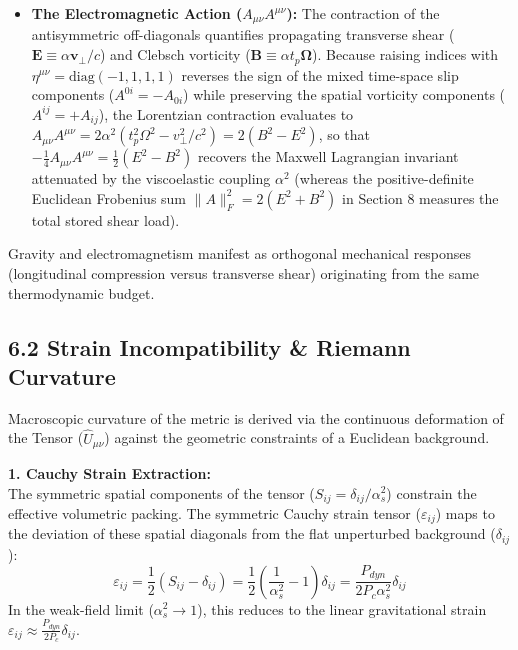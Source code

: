\begin{itemize}
    \item \textbf{The Electromagnetic Action ($A_{\mu\nu} A^{\mu\nu}$):} The contraction of the antisymmetric off-diagonals quantifies propagating transverse shear ($\mathbf{E} \equiv \alpha\mathbf{v}_\perp/c$) and Clebsch vorticity ($\mathbf{B} \equiv \alpha t_p\boldsymbol{\Omega}$). Because raising indices with $\eta^{\mu\nu} = \text{diag}(-1,1,1,1)$ reverses the sign of the mixed time-space slip components ($A^{0i} = -A_{0i}$) while preserving the spatial vorticity components ($A^{ij} = +A_{ij}$), the Lorentzian contraction evaluates to $A_{\mu\nu} A^{\mu\nu} = 2\alpha^2(t_p^2\Omega^2 - v_\perp^2/c^2) = 2(B^2 - E^2)$, so that $-\frac{1}{4}A_{\mu\nu}A^{\mu\nu} = \frac{1}{2}(E^2 - B^2)$ recovers the Maxwell Lagrangian invariant attenuated by the viscoelastic coupling $\alpha^2$ (whereas the positive-definite Euclidean Frobenius sum $\|A\|_F^2 = 2(E^2 + B^2)$ in Section 8 measures the total stored shear load).
\end{itemize}
Gravity and electromagnetism manifest as orthogonal mechanical responses (longitudinal compression versus transverse shear) originating from the same thermodynamic budget.

\subsection*{6.2 Strain Incompatibility \& Riemann Curvature}
\label{sec:deriv_incompatibility}

Macroscopic curvature of the metric is derived via the continuous deformation of the Tensor ($\hat{U}_{\mu\nu}$) against the geometric constraints of a Euclidean background.

\vspace{0.2 cm}

\textbf{1. Cauchy Strain Extraction:} \\
The symmetric spatial components of the tensor ($S_{ij} = \delta_{ij}/\alpha_s^2$) constrain the effective volumetric packing. The symmetric Cauchy strain tensor ($\varepsilon_{ij}$) maps to the deviation of these spatial diagonals from the flat unperturbed background ($\delta_{ij}$): 
\begin{equation}
    \varepsilon_{ij} = \frac{1}{2}\left( S_{ij} - \delta_{ij} \right) = \frac{1}{2}\left( \frac{1}{\alpha_s^2} - 1 \right)\delta_{ij} = \frac{P_{dyn}}{2 P_c \alpha_s^2}\delta_{ij}  %
\end{equation}
In the weak-field limit ($\alpha_s^2 \to 1$), this reduces to the linear gravitational strain $\varepsilon_{ij} \approx \frac{P_{dyn}}{2P_c}\delta_{ij}$.

